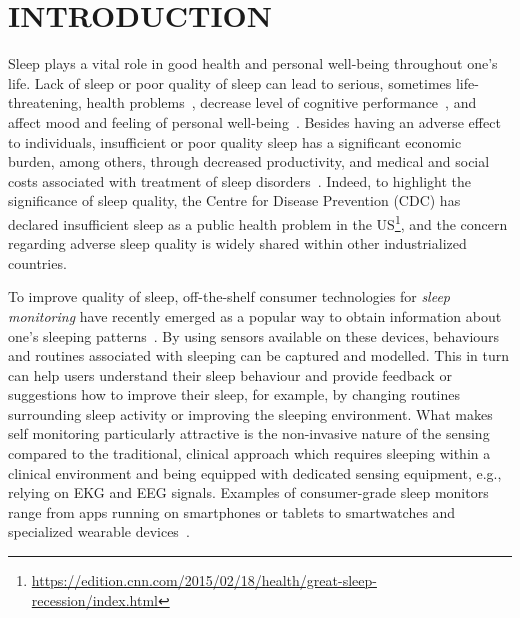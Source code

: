 \section{INTRODUCTION}\label{sec:1introduction}

Sleep plays a vital role in good health and personal well-being throughout one's life. Lack of sleep or poor quality of sleep can lead to
serious, sometimes life-threatening, health problems~\cite{altena2008sleep,chandola2010effect,lallukka2016contribution}, decrease level of cognitive performance~\cite{alhola07sleep,akerstedt07altered}, and affect mood and feeling of personal well-being~\cite{paunio09longitudinal,pilcher97sleep}.
Besides having an adverse effect to individuals, insufficient or poor quality sleep has a significant economic burden, among others, through decreased productivity, and medical and social costs associated with treatment of sleep disorders~\cite{hafner17why}. Indeed, to highlight the significance of sleep quality, the Centre for Disease Prevention (CDC) has declared insufficient sleep
as a public health problem in the US\footnote{\url{https://edition.cnn.com/2015/02/18/health/great-sleep-recession/index.html}}, and the concern regarding adverse sleep quality is widely shared within other industrialized countries.

To improve quality of sleep, off-the-shelf consumer technologies for \emph{sleep monitoring} have recently emerged as a popular way to obtain information about one's sleeping patterns~\cite{ko15consumer}. By using sensors available on these
devices, behaviours and routines associated with sleeping can be captured and modelled. This in turn can help users understand their sleep behaviour and provide feedback or suggestions how to improve their sleep, for example, by changing routines surrounding sleep activity or improving the sleeping environment. What makes self monitoring particularly attractive is the non-invasive nature of the sensing compared to the traditional, clinical approach which requires sleeping within a clinical environment and being equipped with dedicated sensing equipment, e.g., relying on EKG and EEG signals. Examples of consumer-grade sleep monitors range from apps running on smartphones or tablets to smartwatches and 
specialized wearable devices~\cite{zeo,Jawbone,SleepAndroid,fitbit,gu2016sleep,sleepmonitor}. 


